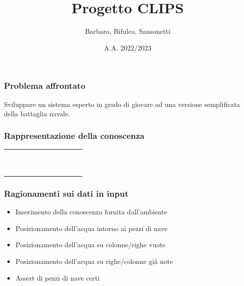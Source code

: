 \documentclass[11pt]{beamer}
\author{Barbaro, Bifulco, Sansonetti}
\title{Progetto CLIPS}
\date{A.A. 2022/2023}
\institute[]{Università degli studi di Torino\\Intelligenza Artificiale e Laboratorio}
\begin{document}
\begin{frame}
\titlepage
\end{frame}


\begin{frame}
    \frametitle{Problema affrontato}
    Sviluppare un sistema esperto in grado di giocare ad una versione semplificata della battaglia navale.
\end{frame}

\begin{frame}
    \frametitle{Rappresentazione della conoscenza}
    \begin{table}
        \begin{tabular}{|l|l|l|l|l|l|l|l|l|l|}
        \hline
         &  &  &  &  &  &  &  &  &  \\ \hline
         &  &  &  &  &  &  &  &  &  \\ \hline
         &  &  &  &  &  &  &  &  &  \\ \hline
         &  &  &  &  &  &  &  &  &  \\ \hline
         &  &  &  &  &  &  &  &  &  \\ \hline
         &  &  &  &  &  &  &  &  &  \\ \hline
         &  &  &  &  &  &  &  &  &  \\ \hline
         &  &  &  &  &  &  &  &  &  \\ \hline
         &  &  &  &  &  &  &  &  &  \\ \hline
         &  &  &  &  &  &  &  &  &  \\ \hline
        \end{tabular}
    \end{table}
\end{frame}

\begin{frame}
    \frametitle{Ragionamenti sui dati in input}
    \begin{itemize}
        \item Inserimento della conoscenza fornita dall'ambiente
        \item Posizionamento dell'acqua intorno ai pezzi di nave
        \item Posizionamento dell'acqua su colonne/righe vuote
        \item Posizionamento dell'acqua su righe/colonne già note
        \item Assert di pezzi di nave certi
    \end{itemize}
\end{frame}
\end{document}
